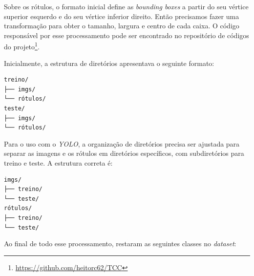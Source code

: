 Sobre os rótulos, o formato inicial define as \emph{bounding boxes} a partir do seu vértice superior esquerdo e do seu vértice inferior direito. Então precisamos fazer uma transformação para obter o tamanho, largura e centro de cada caixa. O código responsável por esse processamento pode ser encontrado no repositório de códigos do projeto\footnote{\url{https://github.com/heitorc62/TCC}}.

Inicialmente, a estrutura de diretórios apresentava o seguinte formato:
\begin{verbatim}
treino/
├── imgs/
└── rótulos/
teste/
├── imgs/
└── rótulos/
\end{verbatim}
Para o uso com o \emph{YOLO}, a organização de diretórios precisa ser ajustada para separar as imagens e os rótulos em diretórios específicos, com subdiretórios para treino e teste. A estrutura correta é:
\begin{verbatim}
imgs/
├── treino/
└── teste/
rótulos/
├── treino/
└── teste/  
\end{verbatim}

Ao final de todo esse processamento, restaram as seguintes classes no \emph{dataset}:

\begin{table}[h!]
\centering
{}
\caption{Nomes originais das classes e suas traduções em português.}
\label{tab:class-names}
\end{table}

